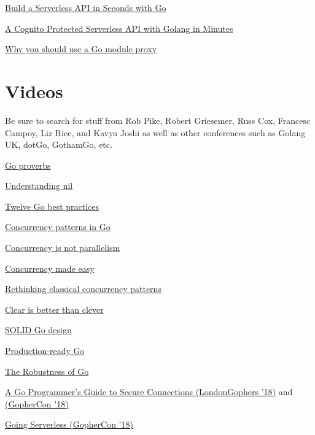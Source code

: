 \documentclass[12pt,notitlepage]{article}
\begin{document}
\href{https://serifandsemaphore.io/build-a-serverless-api-in-seconds-with-go-c504398d86f6}{Build a Serverless API in Seconds with Go}

\href{https://serifandsemaphore.io/a-cognito-protected-serverless-api-with-golang-in-minutes-a054c9f50cf3}{A Cognito Protected Serverless API with Golang in Minutes}

\href{https://arslan.io/2019/08/02/why-you-should-use-a-go-module-proxy/}{Why you should use a Go module proxy}

\section{Videos}
Be sure to search for stuff from Rob Pike, Robert Griesemer, Russ Cox, Francesc Campoy, Liz Rice, and Kavya Joshi
as well as other conferences such as Golang UK, dotGo, GothamGo, etc.

\href{https://www.youtube.com/watch?v=PAAkCSZUG1c}{Go proverbs}

\href{https://www.youtube.com/watch?v=ynoY2xz-F8s}{\color{red} Understanding nil}

\href{https://www.youtube.com/watch?v=8D3Vmm1BGoY}{Twelve Go best practices}

\href{https://www.youtube.com/watch?v=YEKjSzIwAdA}{\color{red} Concurrency patterns in Go}

\href{https://www.youtube.com/watch?v=cN_DpYBzKso}{Concurrency is not parallelism}

\href{https://www.youtube.com/watch?v=yKQOunhhf4A}{Concurrency made easy}

\href{https://www.youtube.com/watch?v=5zXAHh5tJqQ}{\color{red} Rethinking classical concurrency patterns}

\href{https://www.youtube.com/watch?v=WkzGQ-Sm_50}{Clear is better than clever}

\href{https://www.youtube.com/watch?v=zzAdEt3xZ1M}{SOLID Go design}

\href{https://www.youtube.com/watch?v=YF1qSfkDGAQ}{Production-ready Go}

\href{https://www.youtube.com/watch?v=40d26ZGfhR8}{The Robustness of Go}

\href{https://www.youtube.com/watch?v=OF3TM-b890E}{A Go Programmer's Guide to Secure Connections (LondonGophers '18)}
and \href{https://www.youtube.com/watch?v=kxKLYDLzuHA}{(GopherCon '18)}

\href{https://www.youtube.com/watch?v=U7glyWYj4qg}{Going Serverless (GopherCon '18)}
\end{document}

